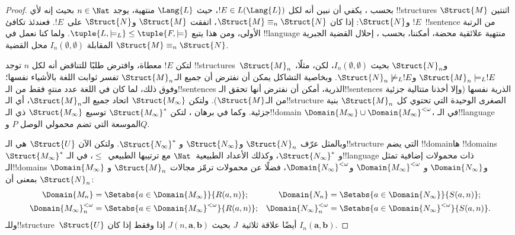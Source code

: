 \documentclass[../../../include/open-logic-section]{subfiles}
\begin{document}
\begin{proof}
بحسب ، يكفي أن نبين أنه لكل
$!E \in L(\Lang{L})$، حيث $\Lang{L}$ منتهية، يوجد $n \in \Nat$ بحيث
إنه لأي !!{structure}s اثنتين $\Struct{M}$ و$\Struct{N}$: إذا كان
$\Struct{M} \equiv_n \Struct{N}$، اتفقت $\Struct{M}$ و$\Struct{N}$
على~$!E$. فعندئذ تكافئ $!E$~!!{sentence} من الرتبة الأولى، ومن هذا يتبع
$\tuple{L,\models_L} \le \tuple{F,\models}$. ولما كنا نعمل في
!!{language} منتهية علائقية محضة، أمكننا، بحسب
، إحلال القضية الجبرية المقابلة
$I_n(\emptyset,\emptyset)$ محل القضية
$\Struct{M} \equiv_n \Struct{N}$.

لتكن $!E$ معطاة، وافترض طلبًا للتناقض أنه لكل $n$ توجد
!!{structure}s~$\Struct{M}_n$ و$\Struct{N}_n$ بحيث
$I_n(\emptyset,\emptyset)$، لكن، مثلًا،
$\Struct{M}_n \models_L !E$ و$\Struct{N}_n \not\models_L !E$. وبخاصية
التشاكل يمكن أن نفترض أن جميع الـ$\Struct{M}_n$ تفسر ثوابت اللغة
بالأشياء نفسها؛ وفوق ذلك، لما كان في اللغة عدد منتهٍ فقط من
الـ!!{sentence}s الذرية، أمكن أن نفترض أنها تحقق الـ!!{sentence}s الذرية
نفسها (وإلا أخذنا متتالية جزئية من الـ$\Struct{M}$). ولتكن
$\Struct{M_\infty}$ اتحاد جميع الـ$\Struct{M}_n$، أي الـ!!{structure}
الصغرى الوحيدة التي تحتوي كل $\Struct{M}_n$ بنية جزئية. وكما في برهان
، لتكن $\Struct{M_\infty}^*$ توسيع
$\Struct{M_\infty}$ ذي الـ!!{domain}
$\Domain{M_\infty} \cup \Domain{M_\infty}^{<\omega}$، في
الـ!!{language} الموسعة التي تضم محمولي الوصل $P$ و$Q$.

وبالمثل عرّف $\Struct{N}_n$ و$\Struct{N_\infty}$ و
$\Struct{N_\infty}^*$. ولتكن الآن $\Struct{U}$ هي الـ!!{structure} التي
يضم !!{domain}ها !!{domain}s~$\Struct{M_\infty}^*$ و
$\Struct{N_\infty}^*$، وكذلك الأعداد الطبيعية~$\Nat$ مع ترتيبها
الطبيعي~$\le$، في الـ!!{language} ذات محمولات إضافية تمثل الـ!!{domain}s
$\Domain{M_\infty}$ و$\Domain{N_\infty}$ و
$\Domain{M_\infty}^{<\omega}$ و$\Domain{N_\infty}^{<\omega}$، فضلًا
عن محمولات ترمّز مجالات $\Struct{M}_n$ و$\Struct{N}_n$ بمعنى أن:
\begin{align*}
  \Domain{M_n} & = \Setabs{a \in \Domain{M_\infty}}{R(a, n)}; &
  \Domain{N_n} & = \Setabs{a \in \Domain{N_\infty}}{S(a,n)}; \\
  \Domain{M_\infty}^{<\omega}_n & = \Setabs{a \in \Domain{M_\infty}^{<\omega}}{R(a,n)}; &
  \Domain{N_\infty}^{<\omega}_n & = \Setabs{a \in \Domain{N_\infty}^{<\omega}}{S(a,n)}.
\end{align*}
وللـ!!{structure}~$\Struct{U}$ أيضًا علاقة ثلاثية~$J$ بحيث
$J(n,\mathbf{a},\mathbf{b})$ إذا وفقط إذا كان
$I_n(\mathbf{a},\mathbf{b})$.


\end{proof}
\end{document}
